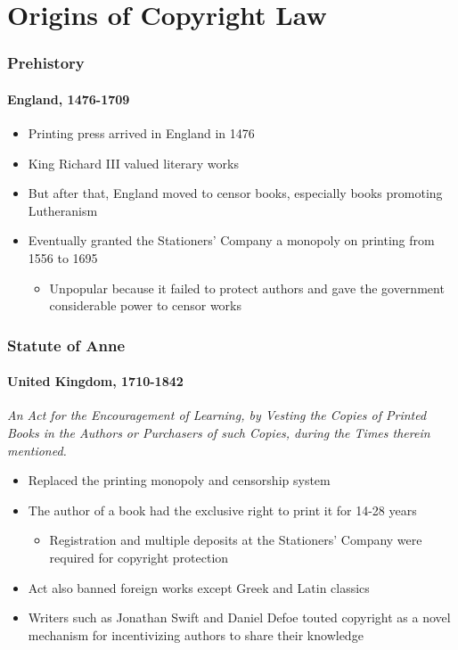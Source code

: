 \section{Origins of Copyright Law}

\begin{frame}
  \frametitle{Prehistory}
  \framesubtitle{England, 1476-1709}

  \begin{itemize}
    \item Printing press arrived in England in 1476
    \item King Richard III valued literary works
    \item But after that, England moved to censor books, especially books
    promoting Lutheranism
    \item Eventually granted the Stationers' Company a monopoly on printing
    from 1556 to 1695
    \begin{itemize}
      \item Unpopular because it failed to protect authors and gave the
      government considerable power to censor works
    \end{itemize}
  \end{itemize}
\end{frame}

\begin{frame}
  \frametitle{Statute of Anne}
  \framesubtitle{United Kingdom, 1710-1842}


  \textit{An Act for the Encouragement of Learning, by Vesting the Copies of
  Printed Books in the Authors or Purchasers of such Copies, during the Times
  therein mentioned.}

  \begin{itemize}
    \item Replaced the printing monopoly and censorship system
    \item The author of a book had the exclusive right to print it for 14-28 years
    \begin{itemize}
      \item Registration and multiple deposits at the Stationers' Company were
      required for copyright protection
    \end{itemize}
    \item Act also banned foreign works except Greek and Latin classics
    \item Writers such as Jonathan Swift and Daniel Defoe touted copyright as a
    novel mechanism for incentivizing authors to share their knowledge
  \end{itemize}
\end{frame}

